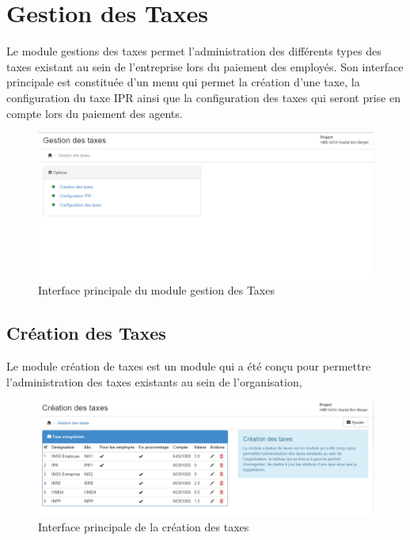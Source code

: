 \documentclass[12pt,a4paper]{report}
\begin{document}
\section{Gestion des Taxes}
Le module gestions des taxes permet l'administration des différents types des taxes existant au sein de l'entreprise lors du paiement des employés. Son interface principale est constituée d'un menu qui permet la création d'une taxe, la configuration du taxe IPR ainsi que la configuration des taxes qui seront prise en compte lors du paiement des agents.
\begin{figure}[h]
\begin{center}
\includegraphics[width=14cm]{pic/GesTaxes.png}
\end{center}
\caption{Interface principale du module gestion des Taxes}
\label{Interface principale du module gestion des Taxes}
\end{figure}

\subsection{Création des Taxes}
Le module création de taxes est un module qui a été conçu pour permettre l'administration des taxes existants au sein de l'organisation,
\begin{figure}[h]
\begin{center}
\includegraphics[width=14cm]{pic/GesCreaTaxes.png}
\end{center}
\caption{Interface principale de la création des taxes}
\label{Interface principale de la création des taxes}
\end{figure}
\end{document}
